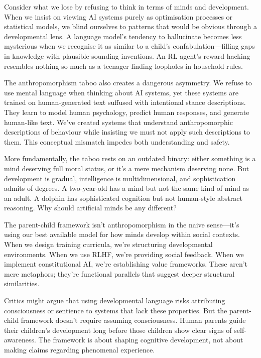 \documentclass[acmsmall,screen]{acmart}
\begin{document}
Consider what we lose by refusing to think in terms of minds and development.
When we insist on viewing AI systems purely as optimisation processes or statistical models, we blind ourselves to patterns that would be obvious through a developmental lens.
A language model's tendency to hallucinate becomes less mysterious when we recognise it as similar to a child's confabulation---filling gaps in knowledge with plausible-sounding inventions.
An RL agent's reward hacking resembles nothing so much as a teenager finding loopholes in household rules.

The anthropomorphism taboo also creates a dangerous asymmetry.
We refuse to use mental language when thinking about AI systems, yet these systems are trained on human-generated text suffused with intentional stance descriptions.
They learn to model human psychology, predict human responses, and generate human-like text.
We've created systems that understand anthropomorphic descriptions of behaviour while insisting we must not apply such descriptions to them.
This conceptual mismatch impedes both understanding and safety.

More fundamentally, the taboo rests on an outdated binary: either something is a mind deserving full moral status, or it's a mere mechanism deserving none.
But development is gradual, intelligence is multidimensional, and sophistication admits of degrees.
A two-year-old has a mind but not the same kind of mind as an adult.
A dolphin has sophisticated cognition but not human-style abstract reasoning.
Why should artificial minds be any different?

The parent-child framework isn't anthropomorphism in the naive sense---it's using our best available model for how minds develop within social contexts.
When we design training curricula, we're structuring developmental environments.
When we use RLHF, we're providing social feedback.
When we implement constitutional AI, we're establishing value frameworks.
These aren't mere metaphors; they're functional parallels that suggest deeper structural similarities.

Critics might argue that using developmental language risks attributing consciousness or sentience to systems that lack these properties.
But the parent-child framework doesn't require assuming consciousness.
Human parents guide their children's development long before those children show clear signs of self-awareness.
The framework is about shaping cognitive development, not about making claims regarding phenomenal experience.
\end{document}

